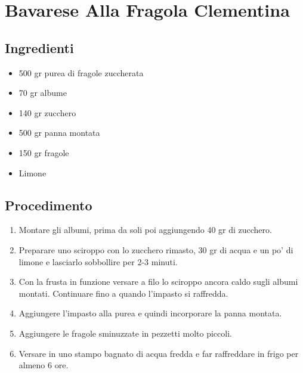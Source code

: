 \section{Bavarese Alla Fragola Clementina}
\subsection{Ingredienti}
\begin{itemize}
\item 500 gr purea di fragole zuccherata  
\item 70 gr albume  
\item 140 gr zucchero  
\item 500 gr panna montata  
\item 150 gr fragole  
\item Limone
\end{itemize}
\subsection{Procedimento}
\begin{enumerate}
\item  Montare gli albumi, prima da soli poi aggiungendo 40 gr di zucchero.  
\item  Preparare uno sciroppo con lo zucchero rimasto, 30 gr di acqua e un po' di limone e lasciarlo sobbollire per 2-3 minuti.  
\item  Con la frusta in funzione versare a filo lo sciroppo ancora caldo sugli albumi montati. Continuare fino a quando l'impasto si raffredda.  
\item  Aggiungere l'impasto alla purea e quindi incorporare la panna montata.  
\item  Aggiungere le fragole sminuzzate in pezzetti molto piccoli.  
\item  Versare in uno stampo bagnato di acqua fredda e far raffreddare in frigo per almeno 6 ore.
\end{enumerate}
